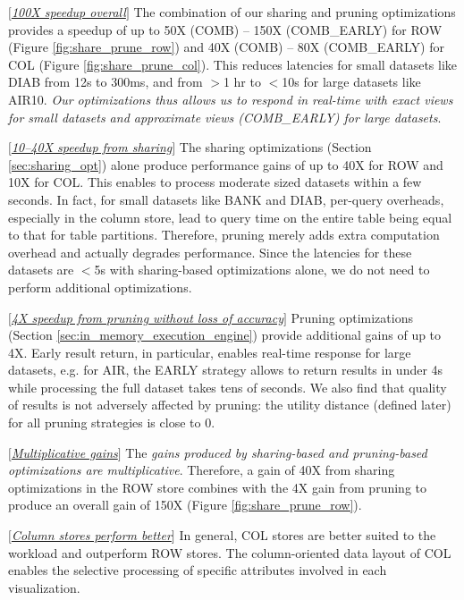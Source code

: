 \begin{denselist} 
\item $[$\underline{\em 100X speedup overall}$]$ The combination of our sharing and pruning optimizations provides a speedup of up to 50X (COMB) -- 150X (COMB\_EARLY) for ROW (Figure \ref{fig:share_prune_row}) and 40X (COMB) -- 80X (COMB\_EARLY) for COL (Figure \ref{fig:share_prune_col}).
This reduces latencies for small datasets like DIAB from 12s to 300ms, and from $>$1 hr to $<$10s for large datasets like AIR10. 
{\it Our optimizations thus allows us to respond in real-time with exact views for small datasets and approximate views (COMB\_EARLY) for large datasets}.
\item $[$\underline{\em 10--40X speedup from sharing}$]$ The sharing optimizations (Section \ref{sec:sharing_opt}) alone produce performance gains of up to 40X for ROW and 10X for COL. This enables \SeeDB to process moderate sized datasets within a few seconds.
In fact, for small datasets like BANK and DIAB, per-query overheads, especially in the column store, lead to query time on the entire table being equal to that for table partitions.
Therefore, pruning merely adds extra computation overhead and actually degrades performance.
Since the latencies for these datasets are $<$5s with sharing-based optimizations alone, we do not need to perform additional optimizations.
\item $[$\underline{\em 4X speedup from pruning without loss of accuracy}$]$ Pruning optimizations (Section \ref{sec:in_memory_execution_engine}) provide additional gains of up to 4X. Early result return, in particular, enables real-time response for large datasets, e.g. for AIR, the EARLY strategy allows \SeeDB to return results in under 4s while processing the full dataset takes tens of seconds. We also find that quality of results is not adversely affected by pruning: the utility distance (defined later) for all pruning strategies is close to 0.
\item $[$\underline{\em Multiplicative gains}$]$ The {\it gains produced by sharing-based and pruning-based optimizations are multiplicative}. Therefore, a gain of 40X from sharing optimizations in the ROW store combines with the 4X gain from pruning to produce an overall gain of 150X (Figure \ref{fig:share_prune_row}).
\item $[$\underline{\em Column stores perform better}$]$ In general, COL stores are better suited to the \SeeDB workload and outperform ROW stores. The column-oriented data layout of COL enables the selective processing of specific attributes involved in each visualization. 

\end{denselist}
